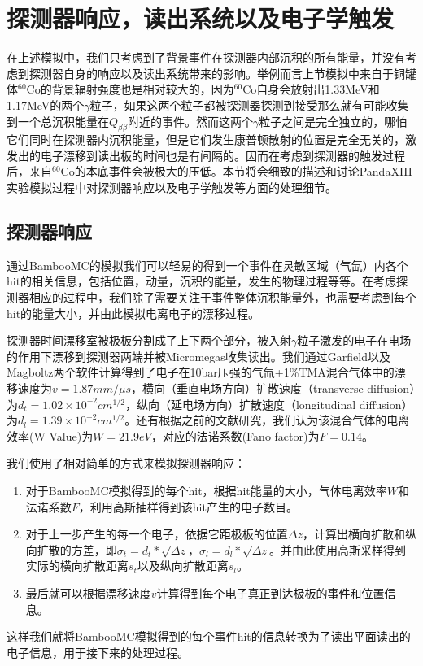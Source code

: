 \section{探测器响应，读出系统以及电子学触发}

在上述模拟中，我们只考虑到了背景事件在探测器内部沉积的所有能量，并没有考虑到探测器自身的响应以及读出系统带来的影响。举例而言上节模拟中来自于铜罐体$^{60}$Co的背景辐射强度也是相对较大的，因为$^{60}$Co自身会放射出1.33MeV和1.17MeV的两个$\gamma$粒子，如果这两个粒子都被探测器探测到接受那么就有可能收集到一个总沉积能量在$Q_{\beta\beta}$附近的事件。然而这两个$\gamma$粒子之间是完全独立的，哪怕它们同时在探测器内沉积能量，但是它们发生康普顿散射的位置是完全无关的，激发出的电子漂移到读出板的时间也是有间隔的。因而在考虑到探测器的触发过程后，来自$^{60}$Co的本底事件会被极大的压低。本节将会细致的描述和讨论PandaXIII实验模拟过程中对探测器响应以及电子学触发等方面的处理细节。

\subsection{探测器响应}

通过BambooMC的模拟我们可以轻易的得到一个事件在灵敏区域（气氙）内各个hit的相关信息，包括位置，动量，沉积的能量，发生的物理过程等等。在考虑探测器相应的过程中，我们除了需要关注于事件整体沉积能量外，也需要考虑到每个hit的能量大小，并由此模拟电离电子的漂移过程。

探测器时间漂移室被极板分割成了上下两个部分，被入射$\gamma$粒子激发的电子在电场的作用下漂移到探测器两端并被Micromegas收集读出。我们通过Garfield\supercite{garfield}以及
Magboltz\supercite{magboltz}两个软件计算得到了电子在10bar压强的气氙+1\%TMA混合气体中的漂移速度为$v=1.87mm/\mu s$，横向（垂直电场方向）扩散速度（transverse diffusion）为$d _{t}=1.02\times 10^{-2}cm^{1/2}$，纵向（延电场方向）扩散速度（longitudinal diffusion）为$d _{l}=1.39\times 10^{-2}cm^{1/2}$。还有根据之前的文献研究，我们认为该混合气体的电离效率(W Value)为$W=21.9eV$，对应的法诺系数(Fano factor)为$F=0.14$\supercite{Aprile:2009dv}。

我们使用了相对简单的方式来模拟探测器响应：
\begin{enumerate}
    \item 对于BambooMC模拟得到的每个hit，根据hit能量的大小，气体电离效率$W$和法诺系数$F$，利用高斯抽样得到该hit产生的电子数目。
    \item 对于上一步产生的每一个电子，依据它距极板的位置$\Delta z$，计算出横向扩散和纵向扩散的方差，即$\sigma_{t}=d_t*\sqrt{\Delta z}$，$\sigma_{l}=d_l*\sqrt{\Delta z}$。并由此使用高斯采样得到实际的横向扩散距离$s_t$以及纵向扩散距离$s_l$。
    \item 最后就可以根据漂移速度$v$计算得到每个电子真正到达极板的事件和位置信息。
\end{enumerate}
这样我们就将BambooMC模拟得到的每个事件hit的信息转换为了读出平面读出的电子信息，用于接下来的处理过程。

